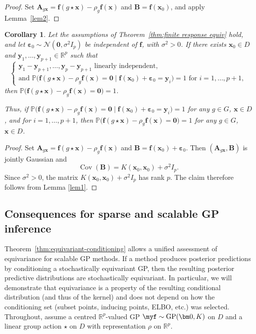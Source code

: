\documentclass[11pt,a4paper]{article}
\newcommand{\R}{\mathbb{R}}
\newcommand{\bff}{\boldsymbol{f}}
\newcommand{\bx}{\boldsymbol{x}}
\newcommand{\by}{\boldsymbol{y}}
\newtheorem{cor}[thm]{Corollary}
\begin{document}
\begin{proof}
Set $\boldsymbol{A}_{g\bx}=\bff(g\star \bx)-\rho_g\bff(\bx)$ and $\boldsymbol{B}=\bff(\bx_0)$, and apply Lemma~\ref{lem2}.
\end{proof}

\begin{cor}
Let the assumptions of Theorem~\ref{thm:finite response equiv} hold, and let $\boldsymbol{\varepsilon}_0\sim \mathcal N(\bm 0,\sigma^2 I_p)$ be independent of $\bff$, with $\sigma^2>0$. If there exists $\bx_0 \in D$ and $\by_1,\dots,\by_{p+1} \in \R^{p}$ such that
$$\left\{
\begin{array}{l}
\by_1-\by_{p+1},\dots,\by_p-\by_{p+1} \text{ linearly independent}, \\
\text{and } \mathbb{P}\bigl(\bff(g\star \bx)-\rho_g\bff(\bx)=\bm 0 \mid \bff(\bx_0)+\boldsymbol{\varepsilon}_0=\by_i\bigr)=1 \text{ for } i=1,\dots,p+1,
\end{array}
\right.
$$then $\mathbb{P}\bigl(\bff(g\star \bx)-\rho_g\bff(\bx)=\bm 0\bigr)=1$.

Thus, if $\mathbb{P}\bigl(\bff(g\star \bx)-\rho_g\bff(\bx)=\bm 0 \mid \bff(\bx_0)+\boldsymbol{\varepsilon}_0=\by_i\bigr)=1$ for any $g \in G$, $\bx\in D$, and for $i=1,\dots,p+1$, then $\mathbb{P}\bigl(\bff(g\star \bx)-\rho_g\bff(\bx)=\bm 0\bigr)=1$ for any $g \in G$, $\bx\in D$.
\end{cor}

\begin{proof}
Set $\boldsymbol{A}_{g\bx}=\bff(g\star \bx)-\rho_g\bff(\bx)$ and $\boldsymbol{B}=\bff(\bx_0)+\boldsymbol{\varepsilon}_0$. Then $(\boldsymbol{A}_{g\bx},\boldsymbol{B})$ is jointly Gaussian and
\begin{equation}
\operatorname{Cov}(\boldsymbol{B})=K(\bx_0,\bx_0)+\sigma^2 I_p.
\end{equation}Since $\sigma^2>0$, the matrix $K(\bx_0,\bx_0)+\sigma^2 I_p$ has rank $p$. The claim therefore follows from Lemma \ref{lem1}.
\end{proof}

\subsection{Consequences for sparse and scalable GP inference}
\label{subsec:consequences-sparse}
Theorem~\ref{thm:equivariant-conditioning} allows a unified assessment of equivariance for scalable GP methods. If a method produces posterior predictions by conditioning a stochastically equivariant GP, then the resulting posterior predictive distributions are stochastically equivariant. In particular, we will demonstrate that equivariance is a property of the resulting conditional distribution (and thus of the kernel) and does not depend on how the conditioning set (subset points, inducing points, ELBO, etc.) was selected. Throughout, assume a centred $\mathbb{R}^p$-valued GP $\myf\sim\mathrm{GP}(\bm 0,K)$ on $D$ and a linear group action $\star$ on $D$ with representation $\rho$ on $\mathbb{R}^p$. %
\end{document}
